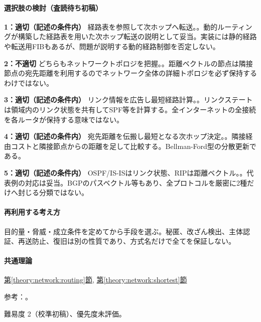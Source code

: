 \paragraph{選択肢の検討（査読待ち初稿）}\mbox{}\par

\noindent\textbf{1：適切（記述の条件内）} 経路表を参照して次ホップへ転送。。動的ルーティングが構築した経路表を用いた次ホップ転送の説明として妥当。実装には静的経路や転送用FIBもあるが、問題が説明する動的経路制御を否定しない。\par

\noindent\textbf{2：不適切} どちらもネットワークトポロジを把握。。距離ベクトルの節点は隣接節点の宛先距離を利用するのでネットワーク全体の詳細トポロジを必ず保持するわけではない。\par

\noindent\textbf{3：適切（記述の条件内）} リンク情報を広告し最短経路計算。。リンクステートは領域内のリンク状態を共有してSPF等を計算する。全インターネットの全接続を各ルータが保持する意味ではない。\par

\noindent\textbf{4：適切（記述の条件内）} 宛先距離を伝搬し最短となる次ホップ決定。。隣接経由コストと隣接節点からの距離を足して比較する。Bellman-Ford型の分散更新である。\par

\noindent\textbf{5：適切（記述の条件内）} OSPF/IS-ISはリンク状態、RIPは距離ベクトル。。代表例の対応は妥当。BGPのパスベクトル等もあり、全プロトコルを厳密に2種だけへ封じる分類ではない。\par

\paragraph{再利用する考え方} 目的量・脅威・成立条件を定めてから手段を選ぶ。秘匿、改ざん検出、主体認証、再送防止、復旧は別の性質であり、方式名だけで全てを保証しない。

\paragraph{共通理論} \hyperref[theory:network:routing]{第\ref*{theory:network:routing}節}, \hyperref[theory:network:shortest]{第\ref*{theory:network:shortest}節}

\par 参考：\cite{net_ospf,net_rip}。

\par 難易度 2（校準初稿）、優先度未評価。

